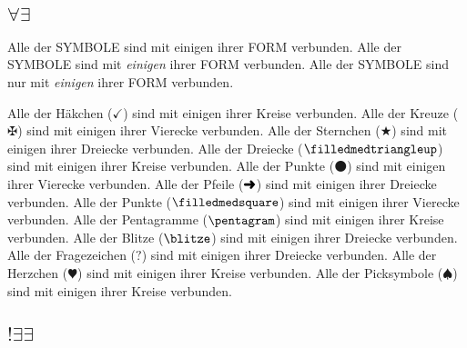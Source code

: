 \documentclass[fleqn,reqno,10pt]{article}
\begin{document}
\subsection{$\forall\exists$}
\label{sec:forallexists}

\begin{exe}
  \ex
    \begin{xlist}
      \ex Alle der SYMBOLE sind mit einigen ihrer FORM verbunden.
      \ex Alle der SYMBOLE sind mit \emph{einigen} ihrer FORM
        verbunden.
      \ex Alle der SYMBOLE sind nur mit \emph{einigen} ihrer FORM
        verbunden.
    \end{xlist}
\end{exe}

\begin{exe}
  \ex
    \begin{xlist}
      \ex Alle der Häkchen ($\checkmark$) sind mit einigen ihrer Kreise verbunden.
      \ex Alle der Kreuze ($\maltese$) sind mit einigen ihrer Vierecke
        verbunden.
      \ex Alle der Sternchen ($\bigstar$) sind mit einigen ihrer
        Dreiecke verbunden.
      \ex Alle der Dreiecke ($\filledmedtriangleup$) sind mit einigen ihrer
        Kreise verbunden.
      \ex Alle der Punkte ($\medbullet$) sind mit einigen ihrer
        Vierecke verbunden.
      \ex Alle der Pfeile ($\text{\ding{220}}$) sind mit einigen ihrer
        Dreiecke verbunden.
      \ex Alle der Punkte ($\filledmedsquare$) sind mit einigen ihrer
        Vierecke verbunden.
      \ex Alle der Pentagramme ($\pentagram$) sind mit einigen ihrer
        Kreise verbunden.
      \ex Alle der Blitze ($\text{\blitze}$) sind mit einigen ihrer
        Dreiecke verbunden.
      \ex Alle der Fragezeichen ($\text{?}$) sind mit einigen ihrer
        Dreiecke verbunden.
      \ex Alle der Herzchen ($\varheartsuit$) sind mit einigen ihrer
        Kreise verbunden.
      \ex Alle der Picksymbole ($\spadesuit$) sind mit einigen ihrer
        Kreise verbunden.
    \end{xlist}
\end{exe}

\subsection{$!\exists\exists$}
\end{document}
